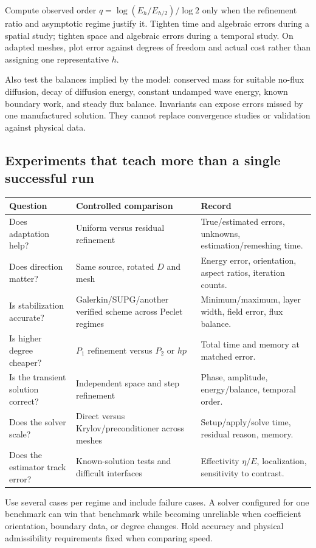 \documentclass[11pt,a4paper]{article}
\begin{document}
Compute observed order $q=\log(E_h/E_{h/2})/\log2$ only when the refinement ratio and asymptotic regime justify it. Tighten time and algebraic errors during a spatial study; tighten space and algebraic errors during a temporal study. On adapted meshes, plot error against degrees of freedom and actual cost rather than assigning one representative $h$.

Also test the balances implied by the model: conserved mass for suitable no-flux diffusion, decay of diffusion energy, constant undamped wave energy, known boundary work, and steady flux balance. Invariants can expose errors missed by one manufactured solution. They cannot replace convergence studies or validation against physical data.

\subsection{Experiments that teach more than a single successful run}
\begin{longtable}{P{0.23\textwidth}P{0.32\textwidth}P{0.37\textwidth}}
\toprule
Question & Controlled comparison & Record\\
\midrule\endhead
Does adaptation help? & Uniform versus residual refinement & True/estimated errors, unknowns, estimation/remeshing time.\\
Does direction matter? & Same source, rotated $D$ and mesh & Energy error, orientation, aspect ratios, iteration counts.\\
Is stabilization accurate? & Galerkin/SUPG/another verified scheme across Peclet regimes & Minimum/maximum, layer width, field error, flux balance.\\
Is higher degree cheaper? & $P_1$ refinement versus $P_2$ or $hp$ & Total time and memory at matched error.\\
Is the transient solution correct? & Independent space and step refinement & Phase, amplitude, energy/balance, temporal order.\\
Does the solver scale? & Direct versus Krylov/preconditioner across meshes & Setup/apply/solve time, residual reason, memory.\\
Does the estimator track error? & Known-solution tests and difficult interfaces & Effectivity $\eta/E$, localization, sensitivity to contrast.\\
\bottomrule
\end{longtable}
Use several cases per regime and include failure cases. A solver configured for one benchmark can win that benchmark while becoming unreliable when coefficient orientation, boundary data, or degree changes. Hold accuracy and physical admissibility requirements fixed when comparing speed.
\end{document}
